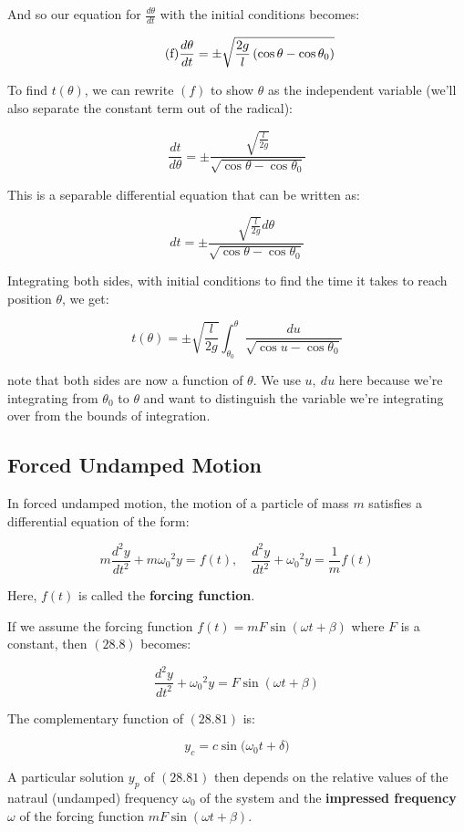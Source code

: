 \documentclass{article}
\begin{document}
And so our equation for $\frac{d\theta}{dt}$ with the initial conditions becomes:

\[ \tag{f} \frac{d\theta}{dt} = \pm \sqrt{\frac{2g}{l}\left(\cos{\theta} - \cos{\theta_0}\right)} \]

To find $t(\theta)$, we can rewrite $(f)$ to show $\theta$ as the independent variable (we'll also separate the constant term out of the radical):

\[ \tag{g} \frac{dt}{d\theta} = \pm \frac{\sqrt{\frac{l}{2g}}}{\sqrt{\cos{\theta} - \cos{\theta_0}}} \]

This is a separable differential equation that can be written as:

\[ \tag{h} dt =  \pm \frac{\sqrt{\frac{l}{2g}} d\theta}{\sqrt{\cos{\theta} - \cos{\theta_0}}} \]

Integrating both sides, with initial conditions to find the time it takes to reach position $\theta$, we get:

\[ \tag{i} t(\theta) = \pm \sqrt{\frac{l}{2g}} \int_{\theta_0}^{\theta}{ \frac{du}{\sqrt{\cos u - \cos \theta_0}} } \]

note that both sides are now a function of $\theta$. We use $u, ~du$ here because we're integrating from $\theta_0$ to $\theta$ and want to distinguish the variable we're integrating over from the bounds of integration.

\subsection{Forced Undamped Motion}

In forced undamped motion, the motion of a particle of mass $m$ satisfies a differential equation of the form:

\[ \tag{28.8} m \frac{d^2y}{dt^2} + m {\omega_0}^2 y = f(t), \quad \frac{d^2y}{dt^2} + {\omega_0}^2 y = \frac{1}{m} f(t) \]

Here, $f(t)$ is called the \textbf{forcing function}.

If we assume the forcing function $f(t) = mF\sin{(\omega t + \beta)}$ where $F$ is a constant, then $(28.8)$ becomes:

\[ \tag{28.81}  \frac{d^2y}{dt^2} + {\omega_0}^2 y = F \sin{(\omega t + \beta)} \]

The complementary function of $(28.81)$ is:

\[ \tag{28.82}  y_c = c \sin{(\omega_0 t + \delta}) \]

A particular solution $y_p$ of $(28.81)$ then depends on the relative values of the natraul (undamped) frequency $\omega_0$ of the system and the \textbf{impressed frequency} $\omega$ of the forcing function $mF\sin{(\omega t + \beta)}$.
\end{document}
